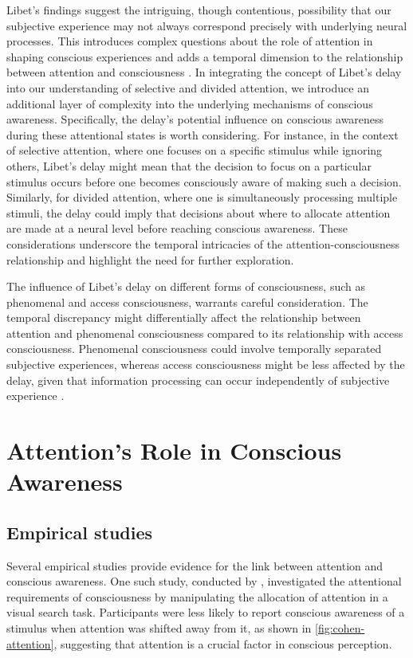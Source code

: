 \documentclass[10pt]{article}
\begin{document}
\begin{sloppypar}
  Libet's findings suggest the intriguing, though contentious, possibility that our subjective experience may not always correspond precisely with underlying neural processes. This introduces complex questions about the role of attention in shaping conscious experiences and adds a temporal dimension to the relationship between attention and consciousness \citep{dijksterhuis_goals_2010}. In integrating the concept of Libet's delay into our understanding of selective and divided attention, we introduce an additional layer of complexity into the underlying mechanisms of conscious awareness. Specifically, the delay's potential influence on conscious awareness during these attentional states is worth considering. For instance, in the context of selective attention, where one focuses on a specific stimulus while ignoring others, Libet's delay might mean that the decision to focus on a particular stimulus occurs before one becomes consciously aware of making such a decision. Similarly, for divided attention, where one is simultaneously processing multiple stimuli, the delay could imply that decisions about where to allocate attention are made at a neural level before reaching conscious awareness. These considerations underscore the temporal intricacies of the attention-consciousness relationship and highlight the need for further exploration.

  The influence of Libet’s delay on different forms of consciousness, such as phenomenal and access consciousness, warrants careful consideration. The temporal discrepancy might differentially affect the relationship between attention and phenomenal consciousness compared to its relationship with access consciousness. Phenomenal consciousness could involve temporally separated subjective experiences, whereas access consciousness might be less affected by the delay, given that information processing can occur independently of subjective experience \citep{dijksterhuis_goals_2010, kozuch_gorillas_2018}.

  \section{Attention’s Role in Conscious Awareness}
  \label{sec:evidence}

  \subsection{Empirical studies}
  \label{sec:empirical}

  Several empirical studies provide evidence for the link between attention and conscious awareness. One such study, conducted by \cite{cohen_attentional_2012}, investigated the attentional requirements of consciousness by manipulating the allocation of attention in a visual search task. Participants were less likely to report conscious awareness of a stimulus when attention was shifted away from it, as shown in \autoref{fig:cohen-attention}, suggesting that attention is a crucial factor in conscious perception.


\end{sloppypar}
\end{document}

